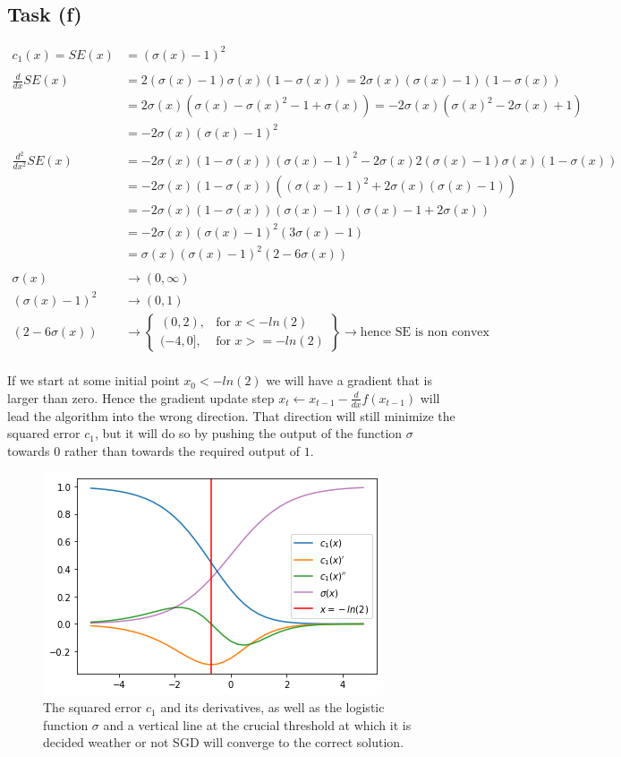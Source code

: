 \documentclass[onecolumn]{article}
\begin{document}
\subsection{Task (f)}
\label{taskf}
\[
\begin{aligned}
	c_1(x)=SE(x) &= (\sigma(x)-1)^2 \\
	\\
	\frac{d}{d x} SE(x)&= 2(\sigma(x)-1)\sigma(x)(1-\sigma(x))=2\sigma(x)(\sigma(x)-1) (1-\sigma(x)) \\
	&=2\sigma(x)(\sigma(x)-\sigma(x)^2-1+\sigma(x))=-2\sigma(x)(\sigma(x)^2-2\sigma(x)+1) \\
	&=-2\sigma(x)(\sigma(x)-1)^2 \\
	\\
	\frac{d^2}{d x^2} SE(x)&=-2\sigma(x)(1-\sigma(x))(\sigma(x)-1)^2-2\sigma(x)2(\sigma(x)-1)\sigma(x)(1-\sigma(x))\\
	&=-2\sigma(x)(1-\sigma(x))((\sigma(x)-1)^2+2\sigma(x)(\sigma(x)-1)) \\ &=-2\sigma(x)(1-\sigma(x))(\sigma(x)-1)(\sigma(x)-1+2\sigma(x)) \\
	&=-2\sigma(x)(\sigma(x)-1)^2(3\sigma(x)-1) \\
	&=\sigma(x)(\sigma(x)-1)^2(2-6\sigma(x)) 
	\\ \\
	\sigma(x)&\to(0,\infty) \\
	(\sigma(x)-1)^2&\to(0,1) \\
	(2-6\sigma(x)) &\to \left\{\begin{array}{lr}
		(0, 2), & \text{for } x < -ln(2) \\
		(-4, 0], & \text{for } x >= -ln(2)
	\end{array}\right\} \to \text{hence SE is non convex}
\end{aligned}
\]\\
If we start at some initial point $x_0<-ln(2)$ we will have a gradient that is larger than zero. Hence the gradient update step $x_{t}\leftarrow x_{t-1}-\frac{d}{dx}f(x_{t-1})$ will lead the algorithm into the wrong direction. That direction will still minimize the squared error $c_1$, but it will do so by pushing the output of the function $\sigma$ towards $0$ rather than towards the required output of $1$.
\begin{figure}[hbt!]
	\centering
	\includegraphics[width=.6\linewidth]{taskf.png}
	\caption{The squared error $c_1$ and its derivatives, as well as the logistic function $\sigma$ and a vertical line at the crucial threshold at which it is decided weather or not SGD will converge to the correct solution.}
\end{figure}
\end{document}
